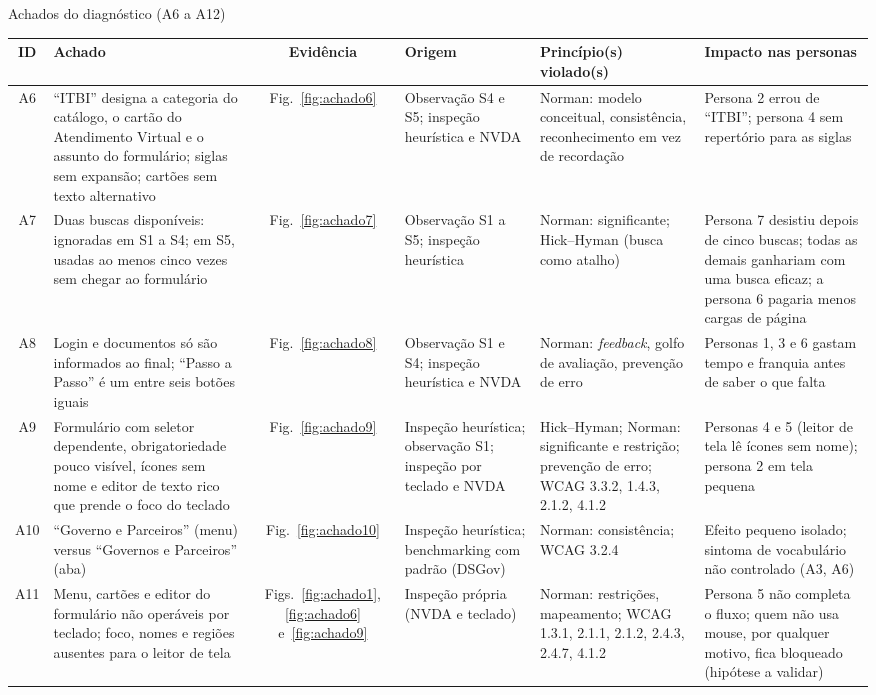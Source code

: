 \documentclass[
  12pt,
  oneside,
  a4paper,
  chapter=TITLE,
  section=TITLE,
  english,
  brazilian
]{abntex2}
\begin{document}
\begin{landscape}
\begin{quadro}[!htbp]
  \caption{Achados do diagnóstico (A6 a A12)}\label{qua:achados2}
  \centering\footnotesize
  \begin{tabularx}{\linewidth}{|c|Y|c|p{3.2cm}|p{4.2cm}|Y|}\hline
    ID & Achado & Evidência & Origem & Princípio(s) violado(s) & Impacto nas personas \\\hline
    A6 & ``ITBI'' designa a categoria do catálogo, o cartão do Atendimento Virtual e o assunto do formulário; siglas sem expansão; cartões sem texto alternativo & Fig.~\ref{fig:achado6} & Observação S4 e S5; inspeção heurística e NVDA & Norman: modelo conceitual, consistência, reconhecimento em vez de recordação & Persona 2 errou de ``ITBI''; persona 4 sem repertório para as siglas \\\hline
    A7 & Duas buscas disponíveis: ignoradas em S1 a S4; em S5, usadas ao menos cinco vezes sem chegar ao formulário & Fig.~\ref{fig:achado7} & Observação S1 a S5; inspeção heurística & Norman: significante; Hick--Hyman (busca como atalho) & Persona 7 desistiu depois de cinco buscas; todas as demais ganhariam com uma busca eficaz; a persona 6 pagaria menos cargas de página \\\hline
    A8 & Login e documentos só são informados ao final; ``Passo a Passo'' é um entre seis botões iguais & Fig.~\ref{fig:achado8} & Observação S1 e S4; inspeção heurística e NVDA & Norman: \textit{feedback}, golfo de avaliação, prevenção de erro & Personas 1, 3 e 6 gastam tempo e franquia antes de saber o que falta \\\hline
    A9 & Formulário com seletor dependente, obrigatoriedade pouco visível, ícones sem nome e editor de texto rico que prende o foco do teclado & Fig.~\ref{fig:achado9} & Inspeção heurística; observação S1; inspeção por teclado e NVDA & Hick--Hyman; Norman: significante e restrição; prevenção de erro; WCAG 3.3.2, 1.4.3, 2.1.2, 4.1.2 & Personas 4 e 5 (leitor de tela lê ícones sem nome); persona 2 em tela pequena \\\hline
    A10 & ``Governo e Parceiros'' (menu) versus ``Governos e Parceiros'' (aba) & Fig.~\ref{fig:achado10} & Inspeção heurística; benchmarking com padrão (DSGov) & Norman: consistência; WCAG 3.2.4 & Efeito pequeno isolado; sintoma de vocabulário não controlado (A3, A6) \\\hline
    A11 & Menu, cartões e editor do formulário não operáveis por teclado; foco, nomes e regiões ausentes para o leitor de tela & Figs.~\ref{fig:achado1}, \ref{fig:achado6} e~\ref{fig:achado9} & Inspeção própria (NVDA e teclado) & Norman: restrições, mapeamento; WCAG 1.3.1, 2.1.1, 2.1.2, 2.4.3, 2.4.7, 4.1.2 & Persona 5 não completa o fluxo; quem não usa mouse, por qualquer motivo, fica bloqueado (hipótese a validar) \\\hline

\end{tabularx}
\end{quadro}
\end{landscape}
\end{document}

